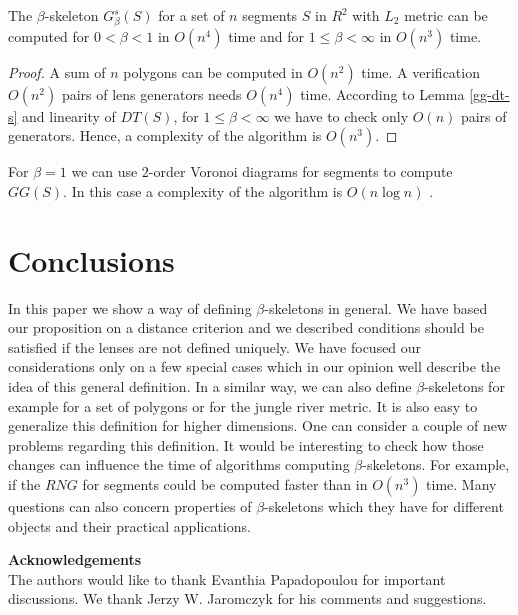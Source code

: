 \documentclass[11pt]{llncs}
\begin{document}
 
\begin{theorem}
The $\beta$-skeleton $G_{\beta}^s(S)$ for a set of $n$ segments $S$ in $R^2$ with $L_2$ metric
can be computed for $0 < \beta < 1$ in $O(n^4)$ time and for $1 \leq \beta < \infty$ in $O(n^3)$
time.
\end{theorem}
\begin{proof}
A sum of $n$ polygons can be computed in $O(n^2)$ time. A verification $O(n^2)$ pairs 
of lens generators needs $O(n^4)$ time.
According to Lemma \ref{gg-dt-s} and linearity of $DT(S)$, for $1 \leq \beta < \infty$
we have to check only $O(n)$ pairs of generators. Hence, a complexity of the algorithm
is $O(n^3)$. 
\end{proof}

For $\beta=1$ we can use $2$-order Voronoi diagrams for segments to compute $GG(S)$.
In this case a complexity of the algorithm is $O(n \log n)$ \cite{km14}.


\section{Conclusions}

In this paper we show a way of defining $\beta$-skeletons in general.
We have based our proposition on a distance criterion and we described conditions
should be satisfied if the lenses are not defined uniquely.
We have focused our considerations only on a few special cases which in our opinion
well describe the idea of this general definition.
In a similar way, we can also define $\beta$-skeletons for example for a set of polygons
or for the jungle river metric.
It is also easy to generalize this definition for higher dimensions. 
One can consider a couple of new problems regarding this definition.
It would be interesting to check how those changes can influence the time 
of algorithms computing $\beta$-skeletons. For example, if the $RNG$ for segments could be
computed faster than in $O(n^3)$ time.
Many questions can also concern properties of $\beta$-skeletons which they have for different objects
and their practical applications. 


\noindent
{\bf Acknowledgements}\\
\noindent
The authors would like to thank Evanthia Papadopoulou for important discussions. 
We thank Jerzy W. Jaromczyk for his comments and suggestions.
\end{document}
